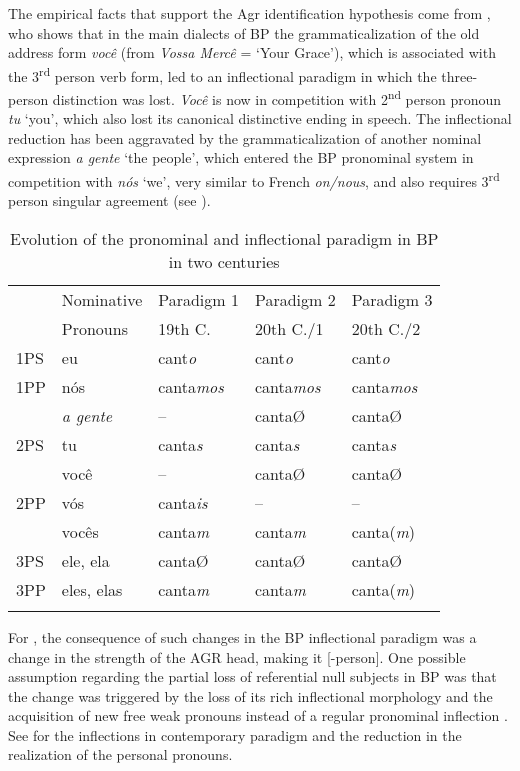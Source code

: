 \documentclass[output=paper,colorlinks,citecolor=brown]{langscibook}
\begin{document}
The empirical facts that support the Agr identification hypothesis come from \citet{duarte_pronome_1993}, who shows that in the main dialects of BP the grammaticalization of the old address form \emph{você}  (from \emph{Vossa Mercê} = `Your Grace'), which is associated with the 3\textsuperscript{rd} person verb form, led to an inflectional paradigm in which the three-person distinction was lost.  \emph{Você} is now in competition with 2\textsuperscript{nd} person pronoun \emph{tu} ‘you', which also lost its canonical distinctive ending in speech. The inflectional reduction has been aggravated by the grammaticalization of another nominal expression \emph{a gente} ‘the people', which entered the BP pronominal system in competition with \emph{nós} ‘we', very similar to French \emph{on/nous}, and also requires 3\textsuperscript{rd} person singular agreement (see \cite{lopes2016}).

\begin{table}
\caption{Evolution of the pronominal and inflectional paradigm in BP in two centuries \citep{duarte_pronome_2018}}
\label{03:table4}
 \begin{tabular}{lllll}
  \lsptoprule
   & Nominative&Paradigm 1& Paradigm 2 &Paradigm 3\\
   & Pronouns & 19th C. & 20th C./1 &20th C./2\\
  \midrule
1PS&eu&cant\textit{o}&cant\textit{o}&cant\textit{o}\\
\tablevspace
1PP & nós & canta\textit{mos} &canta\textit{mos} & canta\textit{mos}\\
& \textit{a gente} & -- & cantaØ & cantaØ\\
\tablevspace
2PS & tu & canta\textit{s} & canta\textit{s}& canta\textit{s} \\
& você&--&cantaØ&cantaØ\\
\tablevspace
2PP & vós & canta\textit{is} & -- & -- \\
& vocês &canta\textit{m}&canta\textit{m}&canta(\textit{m})\\
\tablevspace
3PS&ele, ela&cantaØ&cantaØ&cantaØ\\
\tablevspace
3PP&eles, elas&canta\textit{m}&canta\textit{m}&canta(\textit{m})\\
  \lspbottomrule
 \end{tabular}
\end{table}


For \citet{galves_o_1993}, the consequence of such changes in the BP inflectional paradigm was a change in the strength of the AGR head, making it [-person]. One possible assumption regarding the partial loss of referential null subjects in BP was that the change was triggered by the loss of its rich inflectional morphology \citep{duarte1995,duarte_pronome_2018} and the acquisition of new free weak pronouns instead of a regular pronominal inflection \citep{kato_strong_1999}. See  for the inflections in contemporary paradigm and the reduction in the realization of the personal pronouns.
\end{document}
